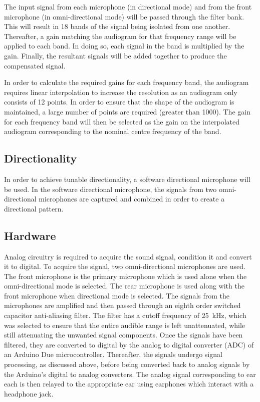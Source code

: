 \documentclass[10pt,twocolumn]{witseiepaper}
\begin{document}
The input signal from each microphone (in directional mode) and from the front microphone (in omni-directional mode) will be passed through the filter bank. This will result in 18 bands of the signal being isolated from one another. Thereafter, a gain matching the audiogram for that frequency range will be applied to each band. In doing so, each signal in the band is multiplied by the gain. Finally, the resultant signals will be added together to produce the compensated signal. 

In order to calculate the required gains for each frequency band, the audiogram requires linear interpolation to increase the resolution as an audiogram only consists of 12 points. In order to ensure that the shape of the audiogram is maintained, a large number of points are required (greater than 1000). The gain for each frequency band will then be selected as the gain on the interpolated audiogram corresponding to the nominal centre frequency of the band.

\subsection{Directionality} \label{sec:directionality}
In order to achieve tunable directionality, a software directional microphone will be used. In the software directional microphone, the signals from two omni-directional microphones are captured and combined in order to create a directional pattern.

\subsection{Hardware} \label{sec:hardware}
Analog circuitry is required to acquire the sound signal, condition it and convert it to digital. To acquire the signal, two omni-directional microphones are used. The front microphone is the primary microphone which is used alone when the omni-directional mode is selected. The rear microphone is used along with the front microphone when directional mode is selected. The signals from the microphones are amplified and then passed through an eighth order switched capacitor anti-aliasing filter. The filter has a cutoff frequency of 25~kHz, which was selected to ensure that the entire audible range is left unattenuated, while still attenuating the unwanted signal components. Once the signals have been filtered, they are converted to digital by the analog to digital converter (ADC) of an Arduino Due microcontroller. Thereafter, the signals undergo signal processing, as discussed above, before being converted back to analog signals by the Arduino's digital to analog converters. The analog signal corresponding to ear each is then relayed to the appropriate ear using earphones which interact with a headphone jack.
\end{document}
